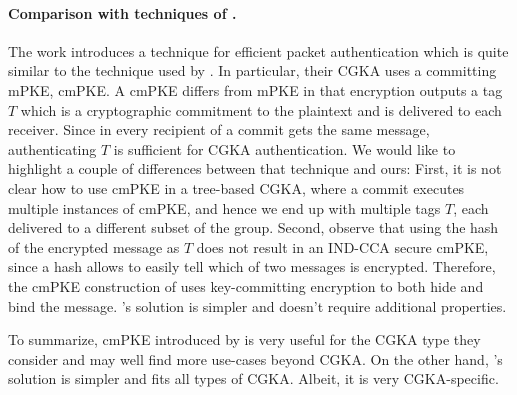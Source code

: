 %



\paragraph{Comparison with techniques of \cite{hashimoto2021cmpke}.}
The work \cite{hashimoto2021cmpke} introduces a technique for efficient packet authentication which is quite similar to the technique used by \saik. In particular, their CGKA uses a committing mPKE, cmPKE. A cmPKE differs from mPKE in that encryption outputs a tag $T$ which is a cryptographic commitment to the plaintext and is delivered to each receiver. Since in \cite{hashimoto2021cmpke} every recipient of a commit gets the same message, authenticating $T$ is sufficient for CGKA authentication.
%
We would like to highlight a couple of differences between that technique and ours:
First, it is not clear how to use cmPKE in a tree-based CGKA, where a commit executes multiple instances of cmPKE, and hence we end up with multiple tags $T$, each delivered to a different subset of the group.
%
Second, observe that using the hash of the encrypted message as $T$ does not result in an IND-CCA secure cmPKE, since a hash allows to easily tell which of two messages is encrypted. Therefore, the cmPKE construction of \cite{hashimoto2021cmpke} uses key-committing encryption to both hide and bind the message. \saik’s solution is simpler and doesn’t require additional properties.

To summarize, cmPKE introduced by \cite{hashimoto2021cmpke} is very useful for the CGKA type they consider and may well find more use-cases beyond CGKA. On the other hand, \saik’s solution is simpler and fits all types of CGKA. Albeit, it is very CGKA-specific.
